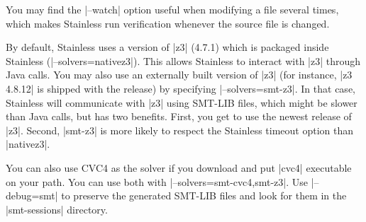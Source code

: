 You may find the |--watch| option useful when modifying a file several times, which makes Stainless
run verification whenever the source file is changed.

By default, Stainless uses a version of |z3| (4.7.1) which is packaged inside Stainless (|--solvers=nativez3|). This allows
Stainless to interact with |z3| through Java calls. You may also use an externally built version of
|z3| (for instance, |z3 4.8.12| is shipped with the release) by specifying |--solvers=smt-z3|.
In that case, Stainless will communicate with |z3| using SMT-LIB files, which might be slower than
Java calls, but has two benefits. First, you get to use the newest release of |z3|. Second,
|smt-z3| is more likely to respect the Stainless timeout option than |nativez3|.

You can also use CVC4 as the solver if you download and put |cvc4| executable on your path.
You can use both with |--solvers=smt-cvc4,smt-z3|. Use |--debug=smt| to preserve the
generated SMT-LIB files and look for them in the |smt-sessions| directory.

